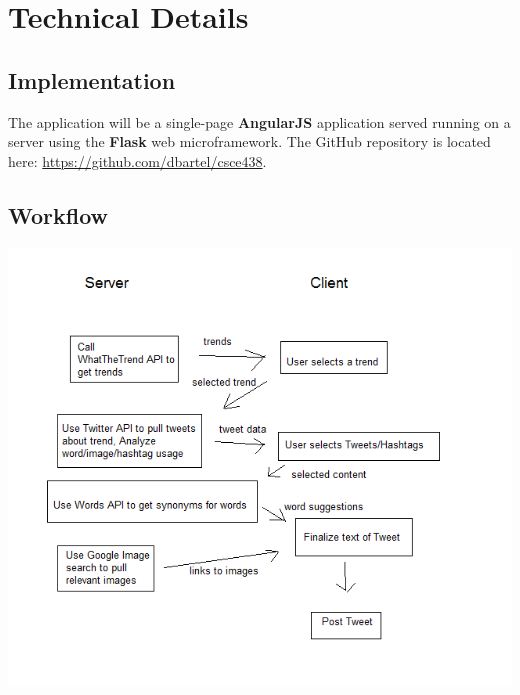 \documentclass{article}
\begin{document}
\section*{Technical Details}

\subsection*{Implementation}
The application will be a single-page \textbf{AngularJS} application served running on a server using the \textbf{Flask} web microframework.
The GitHub repository is located here: \url{https://github.com/dbartel/csce438}.

\subsection*{Workflow}

\includegraphics{diagram.png}
\end{document}

